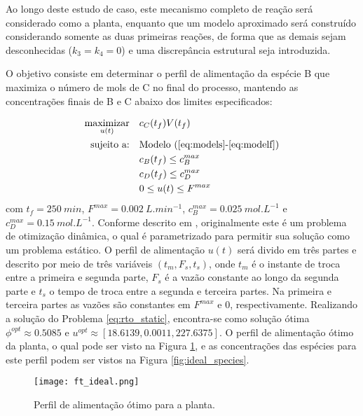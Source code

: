 \documentclass[conference]{IEEEtran}
\begin{document}
Ao longo deste estudo de caso, este mecanismo completo de reação será considerado como a planta, enquanto que um modelo aproximado será construído considerando somente as duas primeiras reações, de forma que as demais sejam desconhecidas ($k_3 = k_4 = 0$) e uma discrepância estrutural seja introduzida.

O objetivo consiste em determinar o perfil de alimentação da espécie B que maximiza o número de mols de C no final do processo, mantendo as concentrações finais de B e C abaixo dos limites especificados:

\begin{equation}
	\begin{alignedat}{2}
		\underset{u(t)}{\text{maximizar}} & \quad c_C(t_f)V(t_f)  \\
		\text{sujeito a:} & \text{\quad Modelo (\ref{eq:models}-\ref{eq:modelf})} \\
		& \quad c_B(t_f) \leq c_B^{max} \\
		& \quad c_D(t_f) \leq c_D^{max} \\
		& \quad 0 \leq u(t) \leq F^{max}
	\end{alignedat}
	\label{eq:rto_static_study}
\end{equation}
com $t_f=250 \: min$, $F^{max}=0.002 \: L.min^{-1}$, $c_B^{max} = 0.025 \: mol.L^{-1}$ e $c_D^{max} = 0.15 \: mol.L^{-1}$. Conforme descrito em \cite{chachuat2009adaptation}, originalmente este é um problema de otimização dinâmica, o qual é parametrizado para permitir sua solução como um problema estático. O perfil de alimentação $u(t)$ será divido em três partes e descrito por meio de três variáveis $(t_m, F_s, t_s)$, onde $t_m$ é o instante de troca entre a primeira e segunda parte, $F_s$ é a vazão constante ao longo da segunda parte e $t_s$ o tempo de troca entre a segunda e terceira partes. Na primeira e terceira partes as vazões são constantes em $F^{max}$ e $0$, respectivamente. Realizando a solução do Problema \ref{eq:rto_static}, encontra-se como solução ótima $\phi^{opt} \approx 0.5085$ e $u^{opt} \approx \left[ 18.6139, 0.0011, 227.6375 \right]$. O perfil de alimentação ótimo da planta, o qual pode ser visto na Figura \ref{fig:ideal_ft}, e as concentrações das espécies para este perfil podem ser vistos na Figura \ref{fig:ideal_species}. 

\begin{figure}[htb]
	\centering
	\texttt{[image: ft\_ideal.png]}
	\caption{Perfil de alimentação ótimo para a planta.}
	\label{fig:ideal_ft}
\end{figure}
\end{document}
